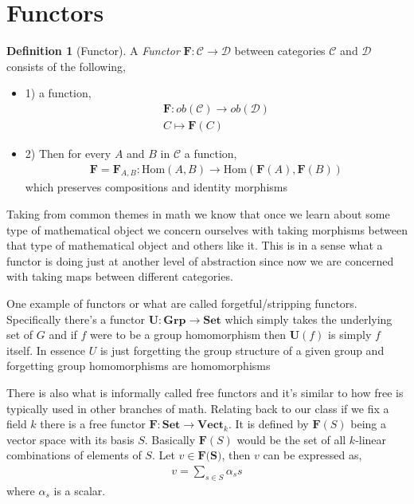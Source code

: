 \documentclass[12pt]{article}
\theoremstyle{definition}
\newtheorem{definition}{Definition}[section]
\theoremstyle{remark}
\begin{document}
    \section{Functors}
    \begin{definition}[Functor]
        A \textit{Functor} $\textbf{F}:\mathcal{C} \to \mathcal{D}$ between categories $\mathcal{C}$ and $\mathcal{D}$ consists of the following,
        \begin{itemize}
            \item{1)} a function,
            \begin{align*}
                \textbf{F}: ob(\mathcal{C}) \to ob(\mathcal{D}) \\
                C \mapsto \textbf{F}(C)
            \end{align*}
            \item{2)} Then for every $A$ and $B$ in $\mathcal{C}$ a function,
            \begin{align*}
                \textbf{F} = \textbf{F}_{A,B}: \text{Hom}(A,B) \to \text{Hom}(\textbf{F}(A), \textbf{F}(B))
            \end{align*}
            which preserves compositions and identity morphisms
        \end{itemize}
        
    \end{definition}

    Taking from common themes in math we know that once we learn about some type of mathematical object we concern ourselves with taking morphisms between that type of mathematical object and others like it. This is in a sense what a functor is doing just at another level of abstraction since now we are concerned with taking maps between different categories. 
    
    

    One example of functors or what are called forgetful/stripping functors. Specifically there's a functor $\textbf{U}: \textbf{Grp}\to \textbf{Set}$ which simply takes the underlying set of $G$ and if $f$ were to be a group homomorphism then $\textbf{U}(f)$ is simply $f$ itself. In essence $U$ is just forgetting the group structure of a given group and forgetting group homomorphisms are homomorphisms 

    There is also what is informally called free functors and it's similar to how free is typically used in other branches of math. Relating back to our class if we fix a field $k$ there is a free functor $\textbf{F}: \textbf{Set} \to \textbf{Vect}_k$. It is defined by $\textbf{F}(S)$ being a vector space with its basis $S$. Basically $\textbf{F}(S)$ would be the set of all $k$-linear combinations of elements of $S$. Let $v\in \textbf{F(S)}$, then $v$ can be expressed as,
    \begin{align*}
        v = \sum_{s\in S} \alpha_s s
    \end{align*} where $\alpha_s$ is a scalar. 
\end{document}
